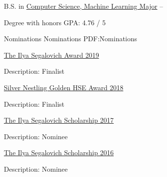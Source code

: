 \documentclass[letterpaper,MMMyyyy,nonstopmode]{simpleresumecv}
\begin{document}
\begin{Body}
\Gap
\BulletItem
B.S. in
\href{https://www.hse.ru/en/ba/ami/}
{Computer Science, Machine Learning Major}
\hfill
{} --
\begin{Detail}
\SubBulletItem
Degree with honors
\SubBulletItem
GPA: 4.76 / 5
\end{Detail}



\Section
{Nominations}
{Nominations}
{PDF:Nominations}

\BulletItem
\href{https://cs.hse.ru/en/stipend/}{The Ilya Segalovich Award 2019}
\begin{Detail}
\Item
Description: Finalist
\end{Detail}

\BulletItem
\href{https://www.hse.ru/gold/cm/silver/2018/gadetsky}{Silver Nestling Golden HSE Award 2018}
\begin{Detail}
\Item
Description: Finalist
\end{Detail}

\BulletItem
\href{https://yandex.com/scholarships/students}{The Ilya Segalovich Scholarship 2017}
\begin{Detail}
\Item
Description: Nominee
\end{Detail}

\BulletItem
\href{https://yandex.com/scholarships/students}{The Ilya Segalovich Scholarship 2016}
\begin{Detail}
\Item
Description: Nominee
\end{Detail}


\iffalse

\Section
{Languages}
{Languages}
{PDF:Languages}

\BulletItem
Russian: Mother tongue.

\Gap
\BulletItem
English: Fluent


\Section
{Skills}
{Skills}
{PDF:Skills}

\BulletItem
Machine Learning, Deep Learning, Probabilistic Machine Learning

\BulletItem
Python, Pytorch, Feel free with Linux
\fi

\iffalse

\begingroup
\color{red}


\end{Body}
\end{document}
